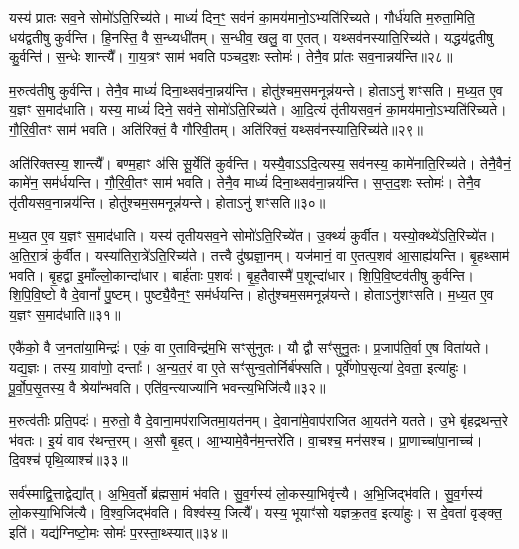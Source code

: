 यस्य॑ प्रातः सव॒ने सोमो॑\-ऽति॒\-रिच्य॑ते।
माध्यं॑ दिन॒ꣳ॒ सव॑नं का॒मय॑मानो॒\-ऽभ्यति॑रिच्यते।
गौर्ध॑यति म॒रुता॒मिति॒ धय॑द्वतीषु कुर्वन्ति।
हि॒नस्ति॒ वै स॒न्ध्यधी॑तम्।
स॒न्धीव॒ खलु॒ वा ए॒तत्।
यथ्सव॑नस्याति॒\-रिच्य॑ते।
यद्धय॑द्वतीषु कु॒र्वन्ति॑।
स॒न्धेः शान्त्यै᳚।
गा॒य॒त्रꣳ साम॑ भवति पञ्चद॒शः स्तोमः॑।
तेनै॒व प्रा॑तः सव॒नान्नय॑न्ति॥२८॥

म॒रुत्व॑तीषु कुर्वन्ति।
तेनै॒व माध्यं॑ दिना॒थ्सव॑ना॒न्नय॑न्ति।
होतु॑श्चम॒समनून्न॑यन्ते।
होताऽनु॑ शꣳसति।
म॒ध्य॒त ए॒व य॒ज्ञꣳ स॒माद॑धाति।
यस्य॒ माध्यं॑ दिने॒ सव॑ने॒ सोमो॑\-ऽति॒\-रिच्य॑ते।
आ॒दि॒त्यं तृ॑तीयसव॒नं का॒मय॑मानो॒\-ऽभ्यति॑रिच्यते।
गौ॒रि॒वी॒तꣳ साम॑ भवति।
अति॑रिक्तं॒ वै गौ॑रिवी॒तम्।
अति॑रिक्तं॒ यथ्सव॑नस्याति॒\-रिच्य॑ते॥२९॥

अति॑रिक्तस्य॒ शान्त्यै᳚।
बण्म॒हाꣳ अ॑सि सू॒र्येति॑ कुर्वन्ति।
यस्यै॒वा\-ऽऽदि॒त्यस्य॒ सव॑नस्य॒ कामे॑नाति॒\-रिच्य॑ते।
तेनै॒वैनं॒ कामे॑न॒ सम॑र्धयन्ति।
गौ॒रि॒वी॒तꣳ साम॑ भवति।
तेनै॒व माध्यं॑ दिना॒थ्सव॑ना॒न्नय॑न्ति।
स॒प्त॒द॒शः स्तोमः॑।
तेनै॒व तृ॑तीयसव॒नान्नय॑न्ति।
होतु॑श्चम॒समनून्न॑यन्ते।
होताऽनु॑ शꣳसति॥३०॥

म॒ध्य॒त ए॒व य॒ज्ञꣳ स॒माद॑धाति।
यस्य॑ तृतीयसव॒ने सोमो॑\-ऽति॒रिच्ये॑त।
उ॒क्थ्यं॑ कुर्वीत।
यस्यो॒क्थ्ये॑\-ऽति॒रिच्ये॑त।
अ॒ति॒रा॒त्रं कु॑र्वीत।
यस्या॑तिरा॒त्रे॑\-ऽति॒\-रिच्य॑ते।
तत्त्वै दु॑ष्प्रज्ञा॒नम्।
यज॑मानं॒ वा ए॒तत्प॒शव॑ आ॒साह्य॑यन्ति।
बृ॒हथ्साम॑ भवति।
बृ॒हद्वा इ॒माँल्लो॒कान्दा॑धार।
बार्\mbox{}ह॑ताः प॒शवः॑।
बृ॒ह॒तैवास्मै॑ प॒शून्दा॑धार।
शि॒पि॒वि॒ष्टव॑तीषु कुर्वन्ति।
शि॒पि॒वि॒ष्टो वै दे॒वानां᳚ पु॒ष्टम्।
पुष्ट्यै॒वैन॒ꣳ॒ सम॑र्धयन्ति।
होतु॑श्चम॒समनून्न॑यन्ते।
होताऽनु॑शꣳसति।
म॒ध्य॒त ए॒व य॒ज्ञꣳ स॒माद॑धाति॥३१॥\anuvakamend[य॒न्ति॒ सव॑नस्याति॒\-रिच्य॑ते शꣳसति दाधारा॒ष्टौ च॑]

एकै॑को॒ वै ज॒नता॑या॒मिन्द्रः॑।
एकं॒ वा ए॒ताविन्द्र॑म॒भि सꣳसु॑नुतः।
यौ द्वौ सꣳ॑सुनु॒तः।
प्र॒जा\-प॑ति॒र्वा ए॒ष विता॑यते।
यद्य॒ज्ञः।
तस्य॒ ग्रावा॑णो॒ दन्ताः᳚।
अ॒न्य॒त॒रं वा ए॒ते सꣳ॑सुन्व॒तोर्निर्ब॑फ्सति।
पूर्वे॑णोप॒सृत्या॑ दे॒वता॒ इत्या॑हुः।
पू॒र्वो॒प॒सृ॒तस्य॒ वै श्रेया᳚न्भवति।
एति॑व॒न्त्याज्या॑नि भवन्त्य॒भिजि॑त्यै॥३२॥

म॒रुत्व॑तीः प्रति॒पदः॑।
म॒रुतो॒ वै दे॒वाना॒मप॑राजितमा॒यत॑नम्।
दे॒वाना॑मे॒वाप॑राजित आ॒यत॑ने यतते।
उ॒भे बृ॑हद्रथन्त॒रे भ॑वतः।
इ॒यं वाव र॑थन्त॒रम्।
अ॒सौ बृ॒हत्।
आ॒भ्यामे॒वैन॑म॒न्तरे॑ति।
वा॒चश्च॒ मन॑सश्च।
प्रा॒णाच्चा॑पा॒नाच्च॑।
दि॒वश्च॑ पृथि॒व्याश्च॑॥३३॥

सर्व॑स्माद्वि॒त्ताद्वेद्या᳚त्।
अ॒भि॒व॒र्तो ब्र॑ह्मसा॒मं भ॑वति।
सु॒व॒र्गस्य॑ लो॒कस्या॒भिवृ॑त्त्यै।
अ॒भि॒जिद्भ॑वति।
सु॒व॒र्गस्य॑ लो॒कस्या॒भिजि॑त्यै।
वि॒श्व॒जिद्भ॑वति।
विश्व॑स्य॒ जित्यै᳚।
यस्य॒ भूयाꣳ॑सो यज्ञक्र॒तव॒ इत्या॑हुः।
स दे॒वता॑ वृङ्क्त॒ इति॑।
यद्य॑ग्निष्टो॒मः सोमः॑ प॒रस्ता॒थ्स्यात्॥३४॥


